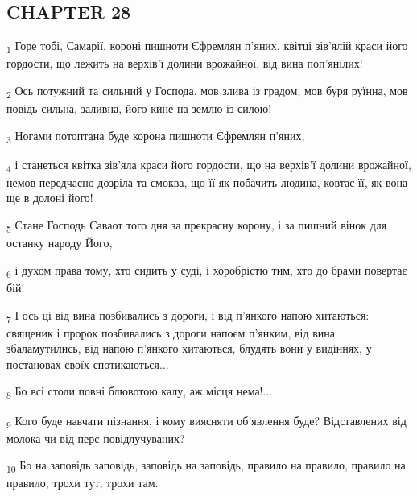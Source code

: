 \subsection{CHAPTER 28}
\begin{tcolorbox}
\textsubscript{1} Горе тобі, Самарії, короні пишноти Єфремлян п'яних, квітці зів'ялій краси його гордости, що лежить на верхів'ї долини врожайної, від вина поп'янілих!
\end{tcolorbox}
\begin{tcolorbox}
\textsubscript{2} Ось потужний та сильний у Господа, мов злива із градом, мов буря руїнна, мов повідь сильна, заливна, його кине на землю із силою!
\end{tcolorbox}
\begin{tcolorbox}
\textsubscript{3} Ногами потоптана буде корона пишноти Єфремлян п'яних,
\end{tcolorbox}
\begin{tcolorbox}
\textsubscript{4} і станеться квітка зів'яла краси його гордости, що на верхів'ї долини врожайної, немов передчасно дозріла та смоква, що її як побачить людина, ковтає її, як вона ще в долоні його!
\end{tcolorbox}
\begin{tcolorbox}
\textsubscript{5} Стане Господь Саваот того дня за прекрасну корону, і за пишний вінок для останку народу Його,
\end{tcolorbox}
\begin{tcolorbox}
\textsubscript{6} і духом права тому, хто сидить у суді, і хоробрістю тим, хто до брами повертає бій!
\end{tcolorbox}
\begin{tcolorbox}
\textsubscript{7} І ось ці від вина позбивались з дороги, і від п'янкого напою хитаються: священик і пророк позбивались з дороги напоєм п'янким, від вина збаламутились, від напою п'янкого хитаються, блудять вони у видіннях, у постановах своїх спотикаються...
\end{tcolorbox}
\begin{tcolorbox}
\textsubscript{8} Бо всі столи повні блювотою калу, аж місця нема!...
\end{tcolorbox}
\begin{tcolorbox}
\textsubscript{9} Кого буде навчати пізнання, і кому виясняти об'явлення буде? Відставлених від молока чи від перс повідлучуваних?
\end{tcolorbox}
\begin{tcolorbox}
\textsubscript{10} Бо на заповідь заповідь, заповідь на заповідь, правило на правило, правило на правило, трохи тут, трохи там.
\end{tcolorbox}
